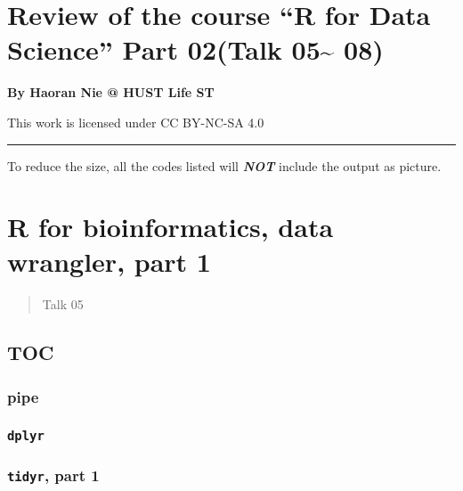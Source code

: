 \documentclass[
]{article}
\author{}
\date{}
\begin{document}
\hypertarget{review-of-the-course-r-for-data-science-part-02talk-05-08}{%
\section{Review of the course ``R for Data Science'' Part 02(Talk
05\textasciitilde{}
08)}\label{review-of-the-course-r-for-data-science-part-02talk-05-08}}

\textbf{By Haoran Nie @ HUST Life ST}

This work is licensed under CC BY-NC-SA 4.0

\begin{center}\rule{0.5\linewidth}{0.5pt}\end{center}

To reduce the size, all the codes listed will \emph{\textbf{NOT}}
include the output as picture.

\tableofcontents

\newpage
{}
\hypertarget{r-for-bioinformatics-data-wrangler-part-1}{%
\section{R for bioinformatics, data wrangler, part
1}\label{r-for-bioinformatics-data-wrangler-part-1}}

\begin{quote}
Talk 05
\end{quote}

\hypertarget{toc}{%
\subsection{TOC}\label{toc}}

\hypertarget{pipe}{%
\subsubsection{pipe}\label{pipe}}

\hypertarget{dplyr}{%
\subsubsection{\texorpdfstring{\texttt{dplyr}}{dplyr}}\label{dplyr}}

\hypertarget{tidyr-part-1}{%
\subsubsection{\texorpdfstring{\texttt{tidyr}, part
1}{tidyr, part 1}}\label{tidyr-part-1}}
\end{document}
